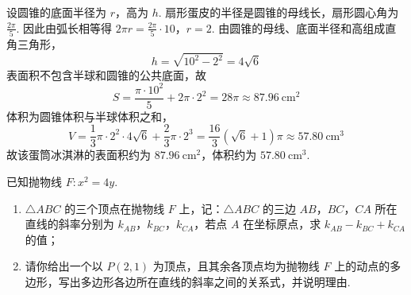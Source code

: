 \begin{solution}
设圆锥的底面半径为 \(r\)，高为 \(h\).
扇形蛋皮的半径是圆锥的母线长，扇形圆心角为 \(\frac{2\pi}{5}\). 因此由弧长相等得
\(2\pi r=\frac{2\pi}{5}\cdot10\)，\(r=2\).
由圆锥的母线、底面半径和高组成直角三角形，
\[
h=\sqrt{10^2-2^2}=4\sqrt{6}
\]
表面积不包含半球和圆锥的公共底面，故
\[
S=\frac{\pi\cdot10^2}{5}+2\pi\cdot2^2
 =28\pi\approx87.96\mathrm{~cm}^{2}
\]
体积为圆锥体积与半球体积之和，
\[
V=\frac{1}{3}\pi\cdot2^2\cdot4\sqrt{6}+\frac{2}{3}\pi\cdot2^3
 =\frac{16}{3}(\sqrt{6}+1)\pi\approx57.80\mathrm{~cm}^{3}
\]
故该蛋筒冰淇淋的表面积约为 \(87.96\mathrm{~cm}^{2}\)，体积约为 \(57.80\mathrm{~cm}^{3}\).
\end{solution}

\begin{problem}
已知抛物线 \( F: x^{2} = 4y \).
\begin{enumerate}
\item \(\triangle ABC\) 的三个顶点在抛物线 \(F\) 上，记：\(\triangle ABC\) 的三边 \(AB\)，\(BC\)，\(CA\) 所在直线的斜率分别为 \(k_{AB}\)，\(k_{BC}\)，\(k_{CA}\)，若点 \(A\) 在坐标原点，求 \(k_{AB} - k_{BC} + k_{CA}\) 的值；
\item 请你给出一个以 \(P(2,1)\) 为顶点，且其余各顶点均为抛物线 \(F\) 上的动点的多边形，写出多边形各边所在直线的斜率之间的关系式，并说明理由.
\end{enumerate}
\end{problem}

